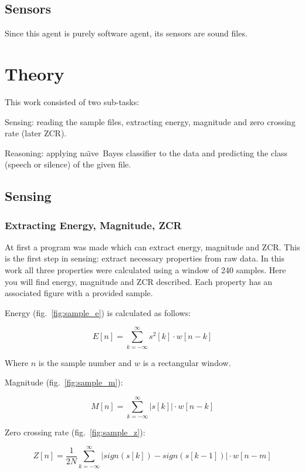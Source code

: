 \documentclass[english,11pt]{article}
\newcommand{\naive}{na\"{\i}ve\ }
\begin{document}
\subsection{Sensors}
Since this agent is purely software agent, its sensors are sound files.


\section{Theory}

This work consisted of two sub-tasks:
\begin{description}
    \item{Sensing:} reading the sample files, extracting energy, magnitude and
        zero crossing rate (later ZCR).

    \item{Reasoning:} applying \naive Bayes classifier to the data and
        predicting the class (speech or silence) of the given file.
\end{description}

\subsection{Sensing}

\subsubsection{Extracting Energy, Magnitude, ZCR}

At first a program was made which can extract energy, magnitude and ZCR. This
is the first step in sensing: extract necessary properties from raw data. In
this work all three properties were calculated using a window of 240 samples.
Here you will find energy, magnitude and ZCR described. Each property has an
associated figure with a provided sample.

Energy (fig.~\ref{fig:sample_e}) is calculated as follows:

$$ E[n] = \sum_{k=-\infty}^{\infty} s^2[k] \cdot w[n-k] $$

Where $n$ is the sample number and $w$ is a rectangular window.

Magnitude (fig.~\ref{fig:sample_m}):

$$ M[n] = \sum_{k=-\infty}^{\infty} |s[k]| \cdot w[n-k] $$

Zero crossing rate (fig.~\ref{fig:sample_z}):

$$
    Z[n] = \frac{1}{2N}
        \sum_{k=-\infty}^{\infty}
        |sign(s[k]) - sign(s[k-1])| \cdot w[n-m]
$$
\end{document}
